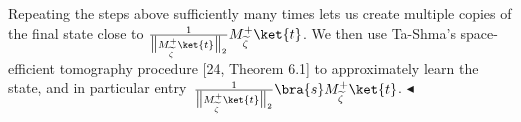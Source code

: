 \documentclass[10pt,a4paper]{article}
\begin{document}
Repeating the steps above sufficiently many times lets us create multiple copies of the final state close to $\frac{1}{\big{\|}M_{\widetilde{\zeta}}^{+}\ket{t}\big{\|}_{2}}M_{\widetilde{\zeta}}^{+}\ket{t}$.
We then use Ta-Shma’s space-efficient tomography procedure [24, Theorem 6.1] to approximately learn the state, and in particular entry $\frac{1}{\big{\|}M_{\widetilde{\zeta}}^{+}\ket{t}\big{\|}_{2}}\bra{s}M_{\widetilde{\zeta}}^{+}\ket{t}$.
$\blacktriangleleft$\par




\par
\end{document}
